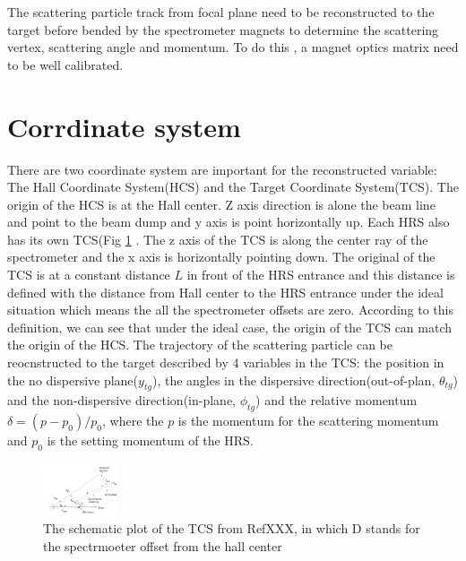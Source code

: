 The scattering particle track from focal plane need to be reconstructed to the target before bended by the spectrometer magnets to determine the scattering vertex, scattering angle and momentum. To do this , a magnet optics matrix need to be well calibrated.
\section{Corrdinate system}
There are two coordinate system are important for the reconstructed variable: The Hall Coordinate System(HCS) and the Target Coordinate System(TCS). The origin of the HCS is at the Hall center.  Z axis direction is alone the beam line and point to the beam dump and y axis is point horizontally up. Each HRS also has its own TCS(Fig \ref{optics_plt1} . The z axis of the TCS is along the center ray of the spectrometer and the x axis is horizontally pointing down. The original of the TCS is at a constant distance   $L$ in front of the HRS entrance and this distance is defined with the distance from Hall center to the HRS entrance under the ideal situation which means the all the spectrometer offsets are zero. According to this definition, we can see that under the ideal case, the origin of the TCS can match the origin of the HCS. The trajectory of the scattering particle can be reocnstructed to the target described by 4 variables in the TCS: the position in the no dispersive plane($y_{tg}$), the angles in the dispersive direction(out-of-plan, $\theta_{tg}$) and the non-dispersive direction(in-plane, $\phi_{tg}$) and the relative momentum $\delta=(p-p_{0})/p_{0}$, where the $p$ is the momentum for the scattering momentum and $p_{0}$ is the setting momentum of the HRS.
\begin{figure}
 	\begin{center}
 		\includegraphics[width=0.2\textwidth] {./optics_plot/optics_4.png}
 		\caption{The schematic plot of the TCS from RefXXX, in which D stands for the spectrmoeter offset from the hall center } \label{optics_plt1}
 	\end{center}
\end{figure}   



